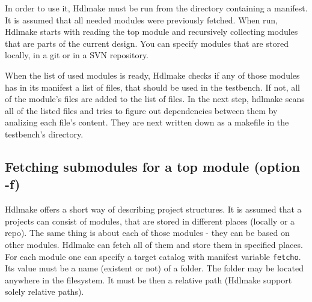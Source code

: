 \documentclass[a4paper,11pt]{article}
\begin{document}
In order to use it, Hdlmake must be run from the directory containing a manifest. It is assumed that all needed modules were previously fetched. When run, Hdlmake starts with reading the top module and recursively collecting modules that are parts of the current design. You can specify modules that are stored locally, in a git or in a SVN repository.

When the list of used modules is ready, Hdlmake checks if any of those modules has in its manifest a list of files, that should be used in the testbench. If not, all of the module's files are added to the list of files. In the next step, hdlmake scans all of the listed files and tries to figure out dependencies between them by analizing each file's content. They are next written down as a makefile in the testbench's directory.
\subsection*{Fetching submodules for a top module (option -f)}
Hdlmake offers a short way of describing project structures. It is assumed that a projects can consist of modules, that are stored in different places (locally or a repo). The same thing is about each of those modules - they can be based on other modules. Hdlmake can fetch all of them and store them in specified places. For each module one can specify a target catalog with manifest variable \verb!fetcho!. Its value must be a name (existent or not) of a folder. The folder may be located anywhere in the filesystem. It must be then a relative path (Hdlmake support solely relative paths).
\end{document}
